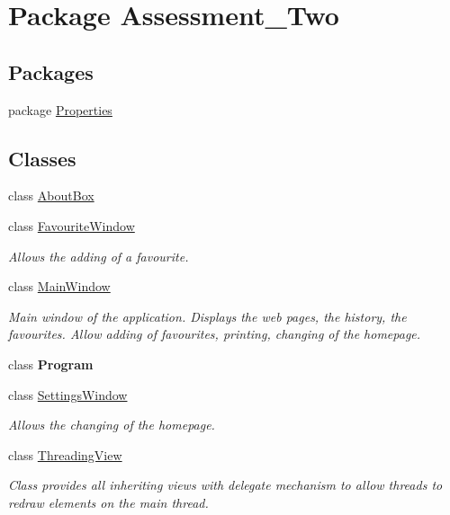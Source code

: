 \hypertarget{namespace_assessment___two}{
\section{Package Assessment\_\-Two}
\label{namespace_assessment___two}
}
\subsection*{Packages}
\begin{DoxyCompactItemize}
\item 
package \hyperlink{namespace_assessment___two_1_1_properties}{Properties}
\end{DoxyCompactItemize}
\subsection*{Classes}
\begin{DoxyCompactItemize}
\item 
class \hyperlink{class_assessment___two_1_1_about_box}{AboutBox}
\item 
class \hyperlink{class_assessment___two_1_1_favourite_window}{FavouriteWindow}
\begin{DoxyCompactList}\small\item\em Allows the adding of a favourite. \item\end{DoxyCompactList}\item 
class \hyperlink{class_assessment___two_1_1_main_window}{MainWindow}
\begin{DoxyCompactList}\small\item\em Main window of the application. Displays the web pages, the history, the favourites. Allow adding of favourites, printing, changing of the homepage. \item\end{DoxyCompactList}\item 
class {\bfseries Program}
\item 
class \hyperlink{class_assessment___two_1_1_settings_window}{SettingsWindow}
\begin{DoxyCompactList}\small\item\em Allows the changing of the homepage. \item\end{DoxyCompactList}\item 
class \hyperlink{class_assessment___two_1_1_threading_view}{ThreadingView}
\begin{DoxyCompactList}\small\item\em Class provides all inheriting views with delegate mechanism to allow threads to redraw elements on the main thread. \item\end{DoxyCompactList}\end{DoxyCompactItemize}

